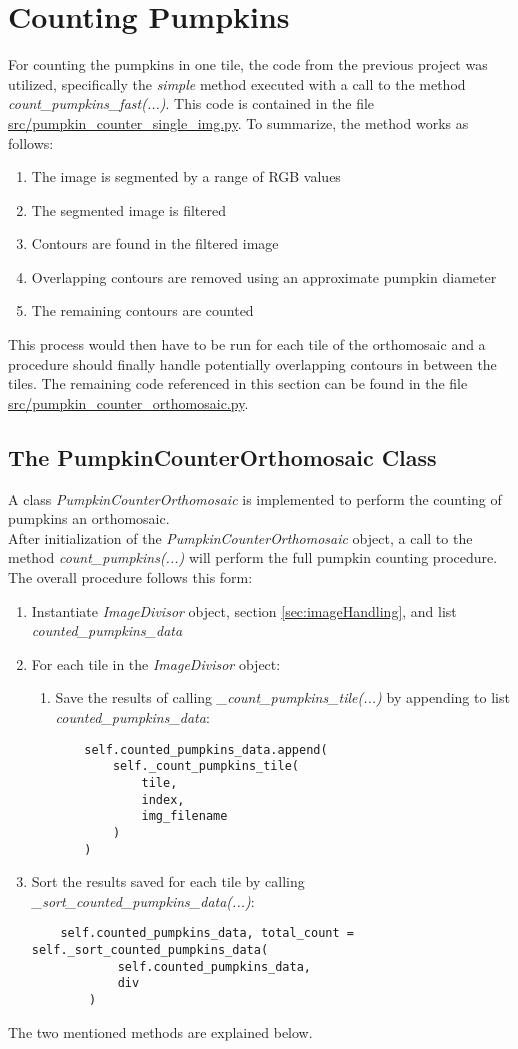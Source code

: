 \documentclass[../Head/Main.tex]{subfiles}
\begin{document}
\section{Counting Pumpkins}
For counting the pumpkins in one tile, the code from the previous project was utilized, specifically the \textit{simple} method executed with a call to the method \textit{count\_pumpkins\_fast(...)}. This code is contained in the file \url{src/pumpkin\_counter\_single\_img.py}. To summarize, the method works as follows:
\begin{enumerate}
\item The image is segmented by a range of RGB values
\item The segmented image is filtered
\item Contours are found in the filtered image
\item Overlapping contours are removed using an approximate pumpkin diameter
\item The remaining contours are counted
\end{enumerate}
This process would then have to be run for each tile of the orthomosaic and a procedure should finally handle potentially overlapping contours in between the tiles. The remaining code referenced in this section can be found in the file \url{src/pumpkin\_counter\_orthomosaic.py}.

\subsection{The PumpkinCounterOrthomosaic Class}
A class \textit{PumpkinCounterOrthomosaic} is implemented to perform the counting of pumpkins an orthomosaic.\\
After initialization of the \textit{PumpkinCounterOrthomosaic} object, a call to the method \textit{count\_pumpkins(...)} will perform the full pumpkin counting procedure. The overall procedure follows this form:
\begin{enumerate}
\item Instantiate \textit{ImageDivisor} object, section \ref{sec:imageHandling}, and list \textit{counted\_pumpkins\_data}
\item For each tile in the \textit{ImageDivisor} object:
\begin{enumerate}
\item Save the results of calling \textit{\_count\_pumpkins\_tile(...)} by appending to list \textit{counted\_pumpkins\_data}:
\begin{verbatim}
    self.counted_pumpkins_data.append(
        self._count_pumpkins_tile(
            tile,
            index,
            img_filename
        )
    )
\end{verbatim}
\end{enumerate}
\item Sort the results saved for each tile by calling \textit{\_sort\_counted\_pumpkins\_data(...)}:
\begin{verbatim}
    self.counted_pumpkins_data, total_count = self._sort_counted_pumpkins_data(
            self.counted_pumpkins_data,
            div
        )
\end{verbatim}
\end{enumerate}
The two mentioned methods are explained below.
\end{document}
